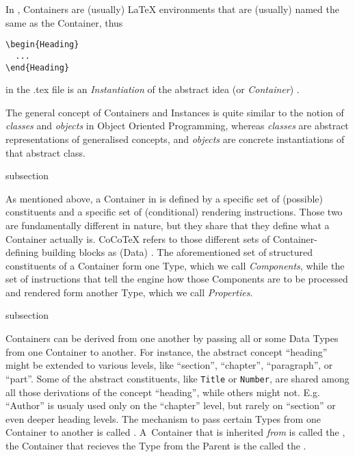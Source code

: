 In {\CoCoTeX}, Containers are (usually) LaTeX environments that are
(usually) named the same as the Container, thus
\begin{lstlisting}
\begin{Heading}
  ...
\end{Heading}
\end{lstlisting}
in the .tex file is an \textit{Instantiation} of the abstract idea (or
\textit{Container}) .

The general concept of Containers and Instances is quite similar to
the notion of \textit{classes} and \textit{objects} in Object Oriented
Programming, whereas \textit{classes} are abstract representations of
generalised concepts, and \textit{objects} are concrete instantiations
of that abstract class.


\begin{Heading}{subsection}
\end{Heading}

As mentioned above, a Container in {\CoCoTeX} is defined by a specific
set of (possible) constituents and a specific set of (conditional)
rendering instructions.  Those two are fundamentally different in
nature, but they share that they define what a Container actually
is. CoCoTeX refers to those different sets of Container-defining
building blocks as (Data) .  The aforementioned
set of structured constituents of a Container form one Type, which we
call \textit{Components}, while the set of instructions that tell the
engine how those Components are to be processed and rendered form
another Type, which we call \textit{Properties}.


\begin{Heading}{subsection}
\end{Heading}

Containers can be derived from one another by passing all or some Data
Types from one Container to another. For instance, the abstract
concept “heading” might be extended to various levels, like “section”,
“chapter”, “paragraph”, or “part”. Some of the abstract constituents,
like \texttt{Title} or \texttt{Number}, are shared among all those
derivations of the concept “heading”, while others might
not. E.g. “Author” is usualy used only on the “chapter” level, but
rarely on “section” or even deeper heading levels. The mechanism to
pass certain Types from one Container to another is called
. A~Container that is inherited \textit{from} is
called the , the Container that recieves
the Type from the Parent is the called the .

